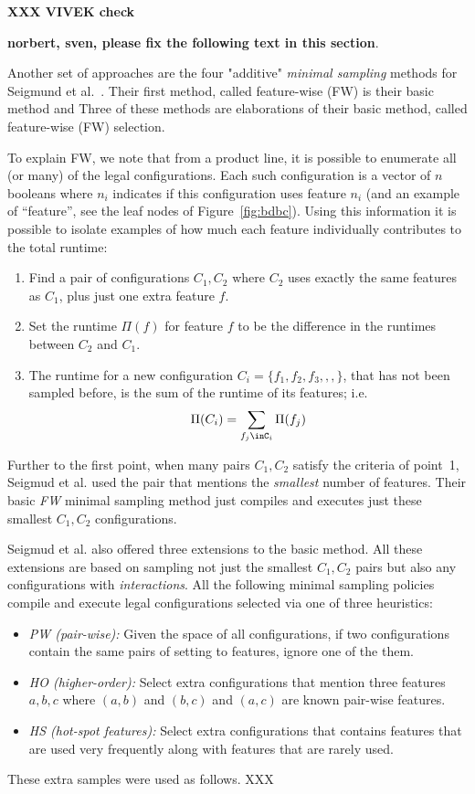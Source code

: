 \documentclass{sig-alternative}
\newcommand{\bi}{\begin{itemize}}%
\newcommand{\ei}{\end{itemize}}
\newcommand{\be}{\begin{enumerate}}
\newcommand{\ee}{\end{enumerate}}
\newcommand{\fig}[1]{Figure~\ref{fig:#1}}
\begin{document}
  {\bf XXX VIVEK check}
  
 {\bf norbert, sven, please fix the following text in this section}.
 
Another set of approaches are the four "additive" {\em minimal sampling} methods for Seigmund et al.~\cite{siegmund2012predicting}.
Their first method, called feature-wise (FW) is their basic method and 
Three of these methods are    elaborations of their basic method, called feature-wise (FW)
selection.

To explain FW, we note that from a product line, it is possible to enumerate all (or many) of the legal configurations. Each such
configuration is a vector of $n$ booleans where $n_i$ indicates if this configuration uses feature $n_i$ (and
an example of ``feature'', see the leaf nodes of \fig{bdbc}).
Using this information it  is possible to isolate examples of how much each feature individually contributes to the total runtime:
\be
\item Find a pair of  configurations $C_1,C_2$  where $C_2$ uses exactly the same features as $C_1$, plus just one  extra feature $f$.
\item Set the runtime $\Pi(f)$ for feature $f$ to be the difference in the runtimes between $C_2$ and $C_1$.
\item The runtime  for a new configuration  $C_i=\{f_1,f_2,f_3,,,\}$, that has not been sampled before,  is the sum of the runtime of its features; i.e.
\[\Pi(C_i) = \sum_{f_j\inC_i}\Pi(f_j)\]
\ee
Further to the first point, when many pairs $C_1,C_2$ satisfy the criteria of point~1, Seigmud et al. used the 
pair that mentions the {\em smallest} number of features. Their basic {\em FW} minimal sampling method 
just compiles and executes just these smallest $C_1,C_2$ configurations. 

Seigmud et al. also offered three extensions to the basic method. All these extensions are based on sampling
not just the smallest $C_1,C_2$  pairs but also any configurations with {\em interactions}. 
All the following minimal sampling policies compile and   execute legal configurations selected via one of three heuristics:
\bi
\item[{\em PW (pair-wise):}] Given the space of all configurations, if two configurations contain the same pairs of setting to features, 
ignore one of the them. 
\item[{\em HO (higher-order):}] Select extra configurations that 
mention three features $a,b,c$ where   $(a,b)$ and $(b,c)$ and $(a,c)$ are known pair-wise features.
\item[{\em HS (hot-spot features):}] Select extra configurations that contains features that are used very
frequently along with features that are rarely used. 
\ei
These extra samples were used as follows. XXX
\end{document}
